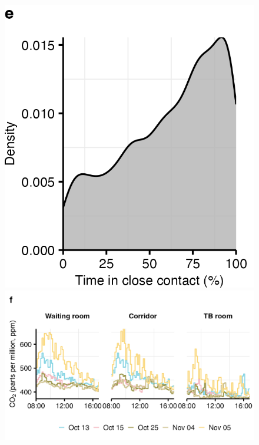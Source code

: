 \documentclass[fleqn,11pt]{wlscirep}
\begin{document}
\begin{figure}
    \includegraphics{results/data/time-close-contacts.png}
    \includegraphics{results/data/co2-levels-over-time.png}

\end{figure}
\end{document}
